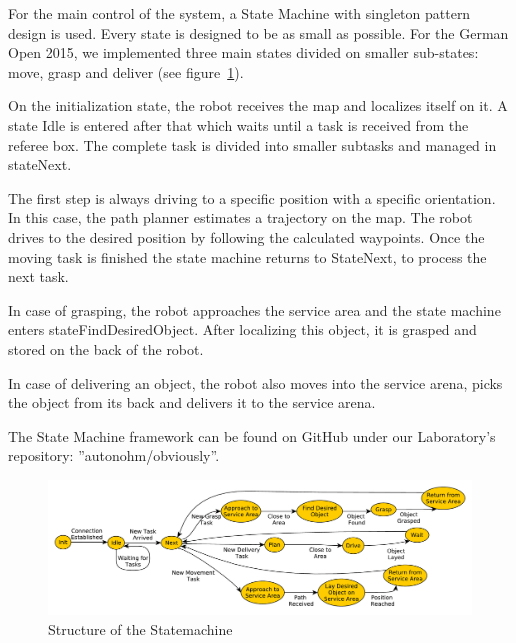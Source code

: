 For the main control of the system, a State Machine with singleton pattern design is used. Every state is designed to be as small as possible. For the German Open 2015, we implemented three main states divided on smaller sub-states: move, grasp and deliver (see figure~\ref{fig:SM}).

On the initialization state, the robot receives the map and localizes itself on it. A state Idle is entered after that which waits until a task is received from the referee box. The complete task is divided into smaller subtasks and managed in stateNext. 

The first step is always driving to a specific position with a specific orientation. In this case, the path planner estimates a trajectory on the map. The robot drives to the desired position by following the calculated waypoints. Once the moving task is finished the state machine returns to StateNext, to process the next task.

In case of grasping, the robot approaches the service area and the state machine enters stateFindDesiredObject. After localizing this object, it is grasped and stored on the back of the robot.


In case of delivering an object, the robot also moves into the service arena, picks the object from its back and delivers it to the service arena.


The State Machine framework can be found on GitHub under our Laboratory’s repository: ”autonohm/obviously”.

\begin{figure}[htbp]
	\centering
	\includegraphics[width=\textwidth]{img/sm}
	\caption{Structure of the Statemachine}
	\label{fig:SM}
\end{figure}